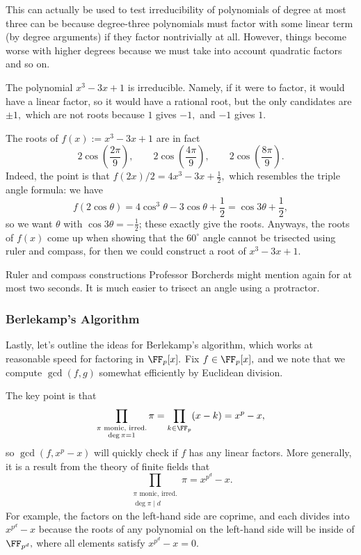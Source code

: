 \documentclass[../notes.tex]{subfiles}
\begin{document}
This can actually be used to test irreducibility of polynomials of degree at most three can be because degree-three polynomials must factor with some linear term (by degree arguments) if they factor nontrivially at all. However, things become worse with higher degrees because we must take into account quadratic factors and so on.
\begin{example}
	The polynomial $x^3-3x+1$ is irreducible. Namely, if it were to factor, it would have a linear factor, so it would have a rational root, but the only candidates are $\pm1,$ which are not roots because $1$ gives $-1,$ and $-1$ gives $1.$
\end{example}
\begin{remark}
	The roots of $f(x):=x^3-3x+1$ are in fact
	\[2\cos\left(\frac{2\pi}9\right),\qquad2\cos\left(\frac{4\pi}9\right),\qquad2\cos\left(\frac{8\pi}9\right).\]
	Indeed, the point is that $f(2x)/2=4x^3-3x+\frac12,$ which resembles the triple angle formula: we have
	\[f(2\cos\theta)=4\cos^3\theta-3\cos\theta+\frac12=\cos3\theta+\frac12,\]
	so we want $\theta$ with $\cos3\theta=-\frac12$; these exactly give the roots. Anyways, the roots of $f(x)$ come up when showing that the $60^\circ$ angle cannot be trisected using ruler and compass, for then we could construct a root of $x^3-3x+1.$
\end{remark}
\begin{remark}
	Ruler and compass constructions Professor Borcherds might mention again for at most two seconds. It is much easier to trisect an angle using a protractor.
\end{remark}

\subsubsection{Berlekamp's Algorithm}
Lastly, let's outline the ideas for Berlekamp's algorithm, which works at reasonable speed for factoring in $\FF_p[x].$ Fix $f\in\FF_p[x],$ and we note that we compute $\gcd(f,g)$ somewhat efficiently by Euclidean division.

The key point is that
\[\prod_{\substack{\pi\text{ monic, irred.}\\\deg\pi=1}}\pi=\prod_{k\in\FF_p}(x-k)=x^p-x,\]
so $\gcd\left(f,x^p-x\right)$ will quickly check if $f$ has any linear factors. More generally, it is a result from the theory of finite fields that
\[\prod_{\substack{\pi\text{ monic, irred.}\\\deg\pi\mid d}}\pi=x^{p^d}-x.\]
For example, the factors on the left-hand side are coprime, and each divides into $x^{p^d}-x$ because the roots of any polynomial on the left-hand side will be inside of $\FF_{p^d},$ where all elements satisfy $x^{p^d}-x=0.$
\end{document}
